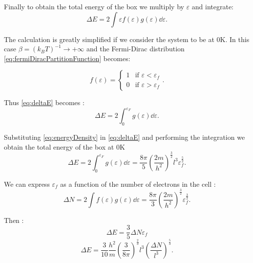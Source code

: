 \documentclass[a4paper,12pt]{article}
\begin{document}
Finally to obtain the total energy of the box we multiply by $\varepsilon$ and integrate:
\begin{equation}\label{eq:deltaE}
	\Delta E = 2 \int \varepsilon f(\varepsilon) g(\varepsilon) \dd{\varepsilon}.
\end{equation}

The calculation is greatly simplified if we consider the system to be at 0K. In this case $\beta = (k_B T)^{-1} \rightarrow + \infty$ and the Fermi-Dirac distribution \eqref{eq:fermiDiracPartitionFunction} becomes:

\begin{equation}
	f(\varepsilon) = \left\lbrace \begin{array}{ll}
		1 & \mbox{if $\varepsilon < \varepsilon_{f} $}  \\
		0 & \mbox{if $\varepsilon > \varepsilon_{f} $}
	\end{array}
	\right. .
\end{equation}


Thus \eqref{eq:deltaE} becomes :
\begin{equation}
	\Delta E = 2 \int_{0}^{\varepsilon_F} g(\varepsilon) \dd{\varepsilon}.
\end{equation}

Substituting \eqref{eq:energyDensity} in \eqref{eq:deltaE} and performing the integration we obtain the total energy of the box at 0K
\begin{equation}
	\Delta E = 2 \int_{0}^{\varepsilon_F} g(\varepsilon) \dd{\varepsilon} = \frac{8\pi}{5} \left( \frac{2 m}{h^2} \right)^{\frac{3}{2}} l^3 \varepsilon_{f}^{\frac{5}{2}}.
\end{equation}

We can express $\varepsilon_f$ as a function of the number of electrons in the cell :
\begin{equation}
	\Delta N = 2 \int f(\varepsilon) g(\varepsilon) \dd{\varepsilon} = \frac{8\pi}{3} \left( \frac{2 m}{h^2} \right)^{\frac{3}{2}} \varepsilon_{f}^{\frac{3}{2}}.
\end{equation}

Then \cite{Parr}:
\begin{equation}
	\Delta E  = \frac{3}{5} \Delta N \varepsilon_{f}
\end{equation}
\begin{equation}
			  \Delta E = \frac{3}{10} \frac{h^2}{m} \left( \frac{3}{8\pi} \right)^{\frac{2}{3}} l^{3} \left( \frac{\Delta N}{l^{3}} \right)^{\frac{5}{3}}.
\end{equation}
\end{document}
